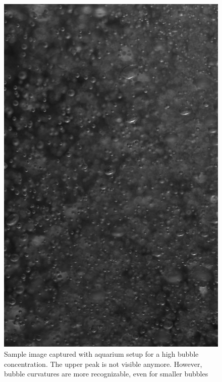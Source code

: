 					
		\begin{figure}
			\includegraphics[scale=0.3]{images/aquarium_result_high_conc.jpg}
			\caption{Sample image captured with aquarium setup for a high bubble concentration. The upper peak is not visible anymore. However, bubble curvatures are more recognizable, even for smaller bubbles}
			\label{fig:aquarium_result_high_conc}
		\end{figure}							
					

